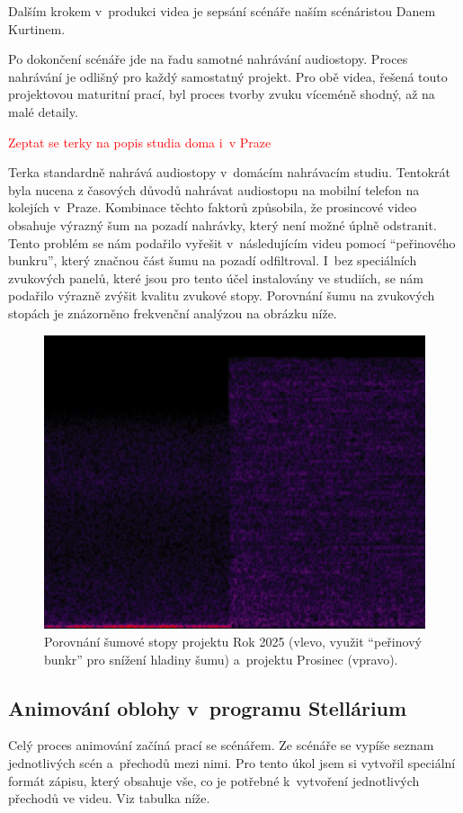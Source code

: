 \documentclass[12pt,a4paper,titlepage]{article}
\begin{document}
Dalším krokem v~produkci videa je sepsání scénáře naším scénáristou Danem Kurtinem. 

Po dokončení scénáře jde na řadu samotné nahrávání audiostopy. Proces nahrávání je odlišný pro každý samostatný projekt. Pro obě videa, řešená touto projektovou maturitní prací, byl proces tvorby zvuku víceméně shodný, až na malé detaily. 

\textcolor{red}{Zeptat se terky na popis studia doma i~v Praze}

Terka standardně nahrává audiostopy v~domácím nahrávacím studiu. Tentokrát byla nucena z časových důvodů nahrávat audiostopu na mobilní telefon na kolejích v~Praze. Kombinace těchto faktorů způsobila, že prosincové video obsahuje výrazný šum na pozadí nahrávky, který není možné úplně odstranit. Tento problém se nám podařilo vyřešit v~následujícím videu pomocí \enquote{peřinového bunkru}, který značnou část šumu na pozadí odfiltroval. I~bez speciálních zvukových panelů, které jsou pro tento účel instalovány ve studiích, se nám podařilo výrazně zvýšit kvalitu zvukové stopy. Porovnání šumu na zvukových stopách je znázorněno frekvenční analýzou na obrázku níže.
\begin{figure}[h]
	\centering
	\includegraphics[width=.4\textwidth]{fourier.png}
	\caption{Porovnání šumové stopy projektu Rok 2025 (vlevo, využit \enquote{peřinový bunkr} pro snížení hladiny šumu) a~projektu Prosinec (vpravo).}\label{img:fourier}
\end{figure}
\subsection{Animování oblohy v~programu Stellárium}\label{makingof:stellarium}
Celý proces animování začíná prací se scénářem. Ze scénáře se vypíše seznam jednotlivých scén a~přechodů mezi nimi. Pro tento úkol jsem si vytvořil speciální formát zápisu, který obsahuje vše, co je potřebné k~vytvoření jednotlivých přechodů ve videu. Viz tabulka níže.
\end{document}
